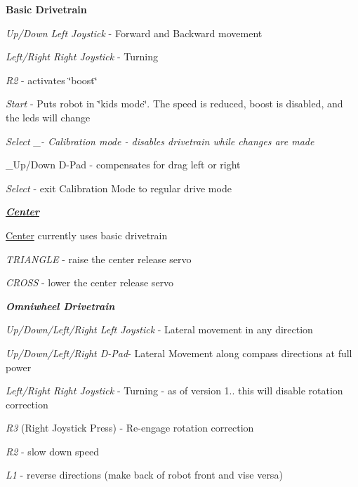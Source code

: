 \begin{DoxyItemize}
\item {\bfseries Basic Drivetrain}
\begin{DoxyItemize}
\item {\itshape Up/\+Down Left Joystick} -\/ Forward and Backward movement
\item {\itshape Left/\+Right Right Joystick} -\/ Turning
\item {\itshape R2} -\/ activates \char`\"{}boost\char`\"{}
\item {\itshape Start} -\/ Puts robot in \char`\"{}kids mode\char`\"{}. The speed is reduced, boost is disabled, and the leds will change
\item {\itshape Select \+\_\+-\/ Calibration mode -\/ disables drivetrain while changes are made
\begin{DoxyItemize}
\item \+\_\+\+Up/\+Down D-\/\+Pad -\/ compensates for drag left or right
\item {\itshape Select} -\/ exit Calibration Mode to regular drive mode
\end{DoxyItemize}}
\end{DoxyItemize}
\item {\itshape {\bfseries \mbox{\hyperlink{class_center}{Center}}}
\begin{DoxyItemize}
\item \mbox{\hyperlink{class_center}{Center}} currently uses basic drivetrain
\item {\itshape T\+R\+I\+A\+N\+G\+LE} -\/ raise the center release servo
\item {\itshape C\+R\+O\+SS} -\/ lower the center release servo
\end{DoxyItemize}}
\item {\itshape {\bfseries Omniwheel Drivetrain}
\begin{DoxyItemize}
\item {\itshape Up/\+Down/\+Left/\+Right Left Joystick} -\/ Lateral movement in any direction
\item {\itshape Up/\+Down/\+Left/\+Right D-\/\+Pad}-\/ Lateral Movement along compass directions at full power
\item {\itshape Left/\+Right Right Joystick} -\/ Turning -\/ as of version 1.. this will disable rotation correction
\item {\itshape R3} (Right Joystick Press) -\/ Re-\/engage rotation correction
\item {\itshape R2} -\/ slow down speed
\item {\itshape L1} -\/ reverse directions (make back of robot front and vise versa)

\end{DoxyItemize}}
\end{DoxyItemize}
